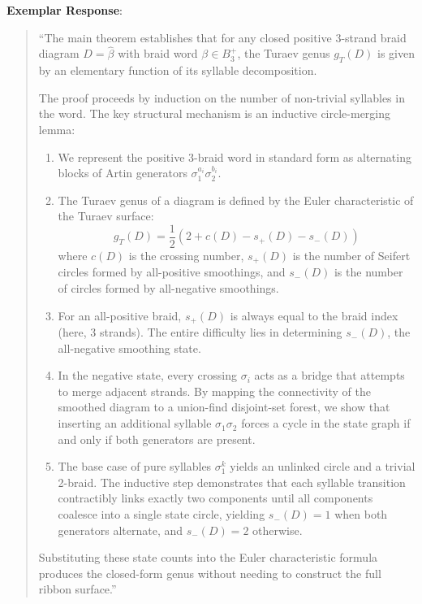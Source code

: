 \documentclass[11pt,letterpaper]{article}
\begin{document}
\begin{exemplarbox}
\textbf{Exemplar Response}:
\begin{quote}
``The main theorem establishes that for any closed positive 3-strand braid diagram $D = \widehat{\beta}$ with braid word $\beta \in B_3^+$, the Turaev genus $g_T(D)$ is given by an elementary function of its syllable decomposition.

The proof proceeds by induction on the number of non-trivial syllables in the word. The key structural mechanism is an inductive circle-merging lemma:
\begin{enumerate}
    \item We represent the positive 3-braid word in standard form as alternating blocks of Artin generators $\sigma_1^{a_i} \sigma_2^{b_i}$.
    \item The Turaev genus of a diagram is defined by the Euler characteristic of the Turaev surface:
    $$g_T(D) = \frac{1}{2}\left(2 + c(D) - s_+(D) - s_-(D)\right)$$
    where $c(D)$ is the crossing number, $s_+(D)$ is the number of Seifert circles formed by all-positive smoothings, and $s_-(D)$ is the number of circles formed by all-negative smoothings.
    \item For an all-positive braid, $s_+(D)$ is always equal to the braid index (here, 3 strands). The entire difficulty lies in determining $s_-(D)$, the all-negative smoothing state.
    \item In the negative state, every crossing $\sigma_i$ acts as a bridge that attempts to merge adjacent strands. By mapping the connectivity of the smoothed diagram to a union-find disjoint-set forest, we show that inserting an additional syllable $\sigma_1 \sigma_2$ forces a cycle in the state graph if and only if both generators are present.
    \item The base case of pure syllables $\sigma_1^k$ yields an unlinked circle and a trivial 2-braid. The inductive step demonstrates that each syllable transition contractibly links exactly two components until all components coalesce into a single state circle, yielding $s_-(D) = 1$ when both generators alternate, and $s_-(D) = 2$ otherwise.
\end{enumerate}
Substituting these state counts into the Euler characteristic formula produces the closed-form genus without needing to construct the full ribbon surface.''
\end{quote}
\end{exemplarbox}

\vspace{1em}
\end{document}
